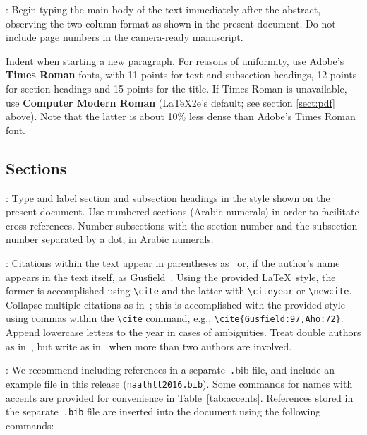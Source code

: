 \documentclass[11pt,letterpaper]{article}
\begin{document}
: Begin typing the main body of the text immediately
after the abstract, observing the two-column format as shown in the present
document. Do not include page numbers in the camera-ready manuscript.  

Indent when starting a new paragraph. For reasons of uniformity,
use Adobe's {\bf Times Roman} fonts, with 11 points for text and 
subsection headings, 12 points for section headings and 15 points for
the title.  If Times Roman is unavailable, use {\bf Computer Modern
  Roman} (\LaTeX2e{}'s default; see section \ref{sect:pdf} above).
Note that the latter is about 10\% less dense than Adobe's Times Roman
font.

\subsection{Sections}

: Type and label section and subsection headings in
the style shown on the present document.  Use numbered sections (Arabic
numerals) in order to facilitate cross references. Number subsections
with the section number and the subsection number separated by a dot,
in Arabic numerals. 

: Citations within the text appear in parentheses
as~\cite{Gusfield:97} or, if the author's name appears in the text itself,
as Gusfield~\citeyear{Gusfield:97}.  Using the provided \LaTeX\ style, the
former is accomplished using {\small\verb|\cite|} and the latter with
{\small\verb|\citeyear|} or {\small\verb|\newcite|}.  Collapse multiple
citations as in~\cite{Gusfield:97,Aho:72}; this is accomplished with the
provided style using commas within the {\small\verb|\cite|} command, e.g.,
{\small\verb|\cite{Gusfield:97,Aho:72}|}. Append lowercase letters to the
year in cases of ambiguities. Treat double authors as in~\cite{Aho:72}, but
write as in~\cite{Chandra:81} when more than two authors are involved.  

:  We recommend
including references in a separate~{\small\texttt .bib} file, and include
an example file in this release ({\small\tt naalhlt2016.bib}). Some commands
for names with accents are provided for convenience in
Table~\ref{tab:accents}. References stored in the separate~{\small\tt .bib}
file are inserted into the document using the following commands:

\small
\begin{verbatim}


\end{verbatim}
\normalsize 
\end{document}
